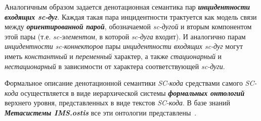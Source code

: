 \begin{SCn}
{Аналогичным образом задается денотационная семантика пар \textit{\textbf{инцидентности входящих sc-дуг}}. Каждая такая пара инцидентности трактуется как модель связи между \textbf{\textit{ориентированной парой}}, обозначаемой \textit{sc-дугой} и вторым компонентом этой пары (т.е. \textit{sc-элементом}, в которой \textit{sc-дуга} входит). И аналогично парам \textit{инцидентности sc-коннекторов} пары \textit{инцидентности входящих sc-дуг} могут иметь \textit{константный} и \textit{переменный} характер, а также \textit{стационарный} и \textit{нестационарный} в зависимости от характера соответствующей \textit{sc-дуги}.

Формальное описание денотационной семантики \textit{SC-кода} средствами самого \textit{SC-кода} осуществляется в виде иерархической системы \textbf{\textit{формальных онтологий}} верхнего уровня, представленных в виде текстов \textit{SC-кода}. В базе знаний \textit{\textbf{Метасистемы IMS.ostis}} все эти онтологии представлены~\cite{IMS}.
}





\end{SCn}
